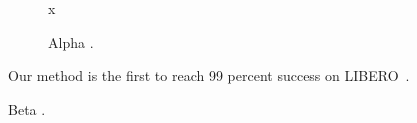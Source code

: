 \documentclass{article}
\newcommand{\libero}{LIBERO~\cite{ka}}
\begin{document}
\begin{figure}\centering x \caption{Alpha \cite{ka}.}\end{figure}

Our method is the first to reach 99 percent success on \libero.

Beta \cite{kb}.


\end{document}
